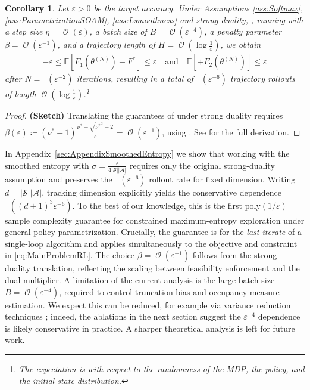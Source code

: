 \documentclass{article}
\theoremstyle{plain}
\newtheorem{corollary}[theorem]{Corollary}
\theoremstyle{definition}
\theoremstyle{remark}
\def\SS{{\mathcal{S}}}
\def\AA{{\mathcal{A}}}
\DeclareMathOperator{\OOTildeSym}{\widetilde{\mathcal{O}}}
\DeclareMathOperator{\OOSym}{\mathcal{O}}
\newcommand{\OOTilde}[1]{{\OOTildeSym\!\left(#1\right)}}
\newcommand{\OO}[1]{{\OOSym\!\left(#1\right)}}
\newcommand{\card}[1]{\left|#1\right|}
\def\epsilon{{\varepsilon}}
\newcommand{\Exp}[1]{{ \mathbb{E}}\!\left[#1\right]}
\DeclarePairedDelimiter{\plus}{[}{]_{+}}
\newcommand{\define}{\coloneqq}
\def\xx{{\theta}}
\def\xxN{\xx^{(N)}}
\def\nuOpt{{\nu^{*}}}
\def\Fopt{{F^*}}
\begin{document}
\begin{corollary}
 \label{cor:FinalRateTranslation}
 Let $\epsilon > 0$ be the target accuracy.
 Under Assumptions \ref{ass:Softmax}, \ref{ass:ParametrizationSOAM},
 \ref{ass:Lsmoothness} and strong duality, ,
 running  with
 a step size $\eta = \OO{\epsilon}$,
 a batch size of $B = \OO{{\epsilon^{-4}}}$,
 a penalty parameter $\beta = \OO{\epsilon^{-1}}$,
 and a trajectory length of
 $H = \OO{\log \frac{1}{\epsilon}}$, we obtain
 \begin{align*}
  -\epsilon \leq \Exp{F_1(\xxN) - \Fopt}
  \leq \epsilon \quad \text{and} \quad
  \Exp{\plus{F_2(\xxN)}} \leq \epsilon
 \end{align*}
 after $N = \OOTilde{\epsilon^{-2}}$ iterations,
 resulting in a total of $\OOTilde{\epsilon^{-6}}$ trajectory rollouts
 of length $\OO{\log \frac{1}{\epsilon}}$.\footnote{
  The expectation is with respect to the randomness of the MDP, the policy, and the initial
  state distribution.
 }
\end{corollary}
\vspace{-0.3cm}
\begin{proof}
 \textbf{(Sketch)} Translating the guarantees of 
 under strong duality requires
 $\beta(\epsilon) \define (\nuOpt + 1)\frac{\nuOpt
   + \sqrt{\nuOpt^2 + 2}}{\epsilon} = \OO{\epsilon^{-1}}$, using
 .
 See  for the full derivation.
\end{proof}

In Appendix~\ref{sec:AppendixSmoothedEntropy} we show that working with the
smoothed entropy with $\sigma=\frac{\epsilon}{4\card{\SS}\card{\AA}}$
requires only the original strong-duality assumption and preserves the
$\OOTilde{\epsilon^{-6}}$ rollout rate for fixed dimension. Writing
$d=\card{\SS}\card{\AA}$, tracking dimension explicitly yields the
conservative dependence $\OOTilde{(d+1)^3\epsilon^{-6}}$. To the best of
our knowledge, this is the first $\mathrm{poly}(1/\epsilon)$ sample
complexity guarantee for constrained maximum-entropy exploration under
general policy parametrization. Crucially, the guarantee is for the
\emph{last iterate} of a single-loop algorithm and applies simultaneously
to the objective and constraint in \eqref{eq:MainProblemRL}. The choice
$\beta = \OO{\epsilon^{-1}}$ follows from the strong-duality translation,
reflecting the scaling between feasibility enforcement and the dual
multiplier. A limitation of the current analysis is the large batch size $B
 = \OO{\epsilon^{-4}}$, required to control truncation bias and
occupancy-measure estimation. We expect this can be reduced, for example
via variance reduction techniques
\citep{zhangConvergenceSampleEfficiency2021,
 barakatReinforcementLearningGeneral2023a,
 fatkhullinStochasticPolicyGradient2023a}; indeed, the ablations in the next
section suggest the $\epsilon^{-4}$ dependence is likely conservative in
practice. A sharper theoretical analysis is left for future work.
\end{document}
